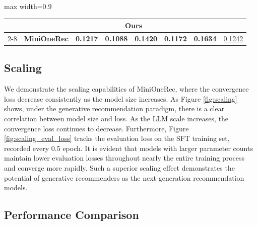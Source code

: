 \begin{table}[t]
\begin{adjustbox}{max width=0.9\textwidth}
\begin{tabular}{cccccccc}
                                      & \multicolumn{7}{c}{\textbf{Ours}}                                 \\ \cmidrule(lr){2-8}
                                      & \cellcolor[HTML]{ECF4FF}\textbf{MiniOneRec}      & \cellcolor[HTML]{ECF4FF}\textbf{0.1217} & \cellcolor[HTML]{ECF4FF}\textbf{0.1088} & \cellcolor[HTML]{ECF4FF}\textbf{0.1420} & \cellcolor[HTML]{ECF4FF}\textbf{0.1172} & \cellcolor[HTML]{ECF4FF}\textbf{0.1634} & \cellcolor[HTML]{ECF4FF}\uline{0.1242}  \\
                                      \bottomrule
\end{tabular}
\end{adjustbox}
\end{table}

\subsection{Scaling}
We demonstrate the scaling capabilities of MiniOneRec, where the convergence loss decrease consistently as the model size increases. 
As Figure \ref{fig:scaling} shows, under the generative recommendation paradigm, there is a clear correlation between model size and loss. As the LLM scale increases, the convergence loss continues to decrease. Furthermore, Figure \ref{fig:scaling_eval_loss} tracks the evaluation loss on the SFT training set, recorded every 0.5 epoch. It is evident that models with larger parameter counts maintain lower evaluation losses throughout nearly the entire training process and converge more rapidly.
Such a superior scaling effect demonstrates the potential of generative recommenders as the next-generation recommendation models.

\subsection{Performance Comparison}

